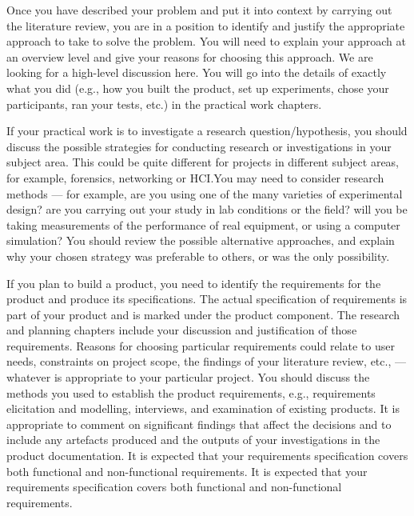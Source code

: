 {    Once you have described your problem and put it into context by carrying out the literature review, you are in a position to identify and justify the appropriate approach
    to take to solve the problem. You will need to explain your approach at an overview level and give your reasons for choosing this approach. We are looking for a
    high-level discussion here. You will go into the details of exactly what you did (e.g., how you built the product, set up experiments, chose your participants, ran your
    tests, etc.) in the practical work chapters.

    If your practical work is to investigate a research question/hypothesis, you should discuss the possible strategies for conducting research or
    investigations in your subject area. This could be quite different for projects in different subject areas, for example, forensics, networking or HCI.\@ You may need to
    consider research methods --- for example, are you using one of the many varieties of experimental design? are you carrying out your study in lab conditions or the
    field? will you be taking measurements of the performance of real equipment, or using a computer simulation? You should review the possible alternative approaches, and
    explain why your chosen strategy was preferable to others, or was the only possibility.

    If you plan to build a product, you need to identify the requirements for the product and produce its specifications. The actual specification of requirements is part
    of your product and is marked under the product component. The research and planning chapters include your discussion and justification of those requirements. Reasons
    for choosing particular requirements could relate to user needs, constraints on project scope, the findings of your literature review, etc., --- whatever is appropriate
    to your particular project. You should discuss the methods you used to establish the product requirements, e.g., requirements elicitation and modelling, interviews,
    and examination of existing products. It is appropriate to comment on significant findings that affect the decisions and to include any artefacts produced and the outputs
    of your investigations in the product documentation. It is expected that your requirements specification covers both functional and non-functional requirements. It is
    expected that your requirements specification covers both functional and non-functional requirements.

}
